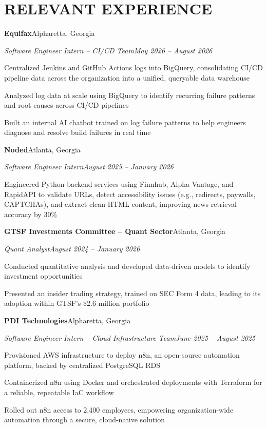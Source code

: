 \documentclass[letterpaper,10pt]{article}
\newcommand{\headerrow}[2]{\textbf{#1}\hfill #2\par}
\newcommand{\subrow}[2]{\textit{#1}\hfill \textit{#2}\par}
\newcommand{\gap}{\vspace{3pt}}
\begin{document}
\section{RELEVANT EXPERIENCE}
\headerrow{Equifax}{Alpharetta, Georgia}
\subrow{Software Engineer Intern -- CI/CD Team}{May 2026 -- August 2026}
\begin{tight}
  \item Centralized Jenkins and GitHub Actions logs into BigQuery, consolidating CI/CD pipeline data across the organization into a unified, queryable data warehouse
  \item Analyzed log data at scale using BigQuery to identify recurring failure patterns and root causes across CI/CD pipelines
  \item Built an internal AI chatbot trained on log failure patterns to help engineers diagnose and resolve build failures in real time
\end{tight}
\gap
\headerrow{Noded}{Atlanta, Georgia}
\subrow{Software Engineer Intern}{August 2025 -- January 2026}
\begin{tight}
  \item Engineered Python backend services using Finnhub, Alpha Vantage, and RapidAPI to validate URLs, detect accessibility issues (e.g., redirects, paywalls, CAPTCHAs), and extract clean HTML content, improving news retrieval accuracy by 30\%
\end{tight}
\gap
\headerrow{GTSF Investments Committee -- Quant Sector}{Atlanta, Georgia}
\subrow{Quant Analyst}{August 2024 -- January 2026}
\begin{tight}
  \item Conducted quantitative analysis and developed data-driven models to identify investment opportunities
  \item Presented an insider trading strategy, trained on SEC Form 4 data, leading to its adoption within GTSF's \$2.6 million portfolio
\end{tight}
\gap
\headerrow{PDI Technologies}{Alpharetta, Georgia}
\subrow{Software Engineer Intern -- Cloud Infrastructure Team}{June 2025 -- August 2025}
\begin{tight}
  \item Provisioned AWS infrastructure to deploy n8n, an open-source automation platform, backed by centralized PostgreSQL RDS
  \item Containerized n8n using Docker and orchestrated deployments with Terraform for a reliable, repeatable IaC workflow
  \item Rolled out n8n access to 2,400 employees, empowering organization-wide automation through a secure, cloud-native solution
\end{tight}
\end{document}
